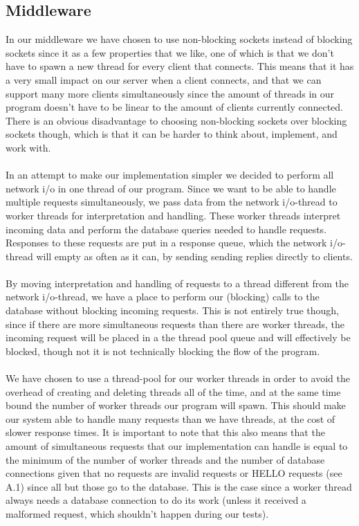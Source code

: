 \documentclass{article}
\begin{document}
        \subsection{Middleware}
            \label{sec:description_middleware}
            In our middleware we have chosen to use non-blocking sockets instead of blocking sockets since it as a few properties that we like, one of which is that we don't have to spawn a new thread for every client that connects. This means that it has a very small impact on our server when a client connects, and that we can support many more clients simultaneously since the amount of threads in our program doesn't have to be linear to the amount of clients currently connected. There is an obvious disadvantage to choosing non-blocking sockets over blocking sockets though, which is that it can be harder to think about, implement, and work with.\\
            \\
            In an attempt to make our implementation simpler we decided to perform all network i/o in one thread of our program. Since we want to be able to handle multiple requests simultaneously, we pass data from the network i/o-thread to worker threads for interpretation and handling. These worker threads interpret incoming data and perform the database queries needed to handle requests. Responses to these requests are put in a response queue, which the network i/o-thread will empty as often as it can, by sending sending replies directly to clients.\\
            \\
            By moving interpretation and handling of requests to a thread different from the network i/o-thread, we have a place to perform our (blocking) calls to the database without blocking incoming requests. This is not entirely true though, since if there are more simultaneous requests than there are worker threads, the incoming request will be placed in a the thread pool queue and will effectively be blocked, though not it is not technically blocking the flow of the program.\\
            \\
            We have chosen to use a thread-pool for our worker threads in order to avoid the overhead of creating and deleting threads all of the time, and at the same time bound the  number of worker threads our program will spawn. This should make our system able to handle many requests than we have threads, at the cost of slower response times. It is important to note that this also means that the amount of simultaneous requests that our implementation can handle is equal to the minimum of the number of worker threads and the number of database connections given that no requests are invalid requests or HELLO requests (see A.1) since all but those go to the database. This is the case since a worker thread always needs a database connection to do its work (unless it received a malformed request, which shouldn't happen during our tests).\\
\end{document}
